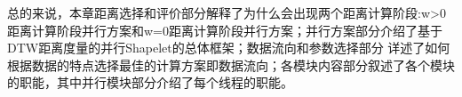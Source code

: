 

总的来说，本章距离选择和评价部分解释了为什么会出现两个距离计算阶段:w>0距离计算阶段并行方案和w=0距离计算阶段并行方案；并行方案部分介绍了基于DTW距离度量的并行Shapelet的总体框架；数据流向和参数选择部分
详述了如何根据数据的特点选择最佳的计算方案即数据流向；各模块内容部分叙述了各个模块的职能，其中并行模块部分介绍了每个线程的职能。
%



